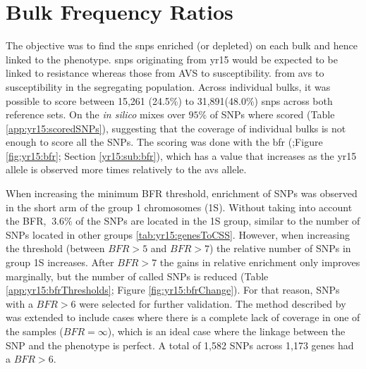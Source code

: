 \section{Bulk Frequency Ratios}
\label{sec:yr15:bfr}



The objective was to find the \acrshort{snp}s enriched  (or depleted) on each bulk and hence linked to the phenotype.  \Glspl{snp} originating from \gls{yr15} would be expected to be linked to resistance whereas those from AVS to susceptibility. from \gls{avs} to susceptibility in the segregating population. 
Across individual bulks, it was possible to score between 15,261 (24.5\%) to 31,891(48.0\%) \glspl{snp} across both reference sets.
On the \textit{in silico} mixes over $95\%$ of SNPs where scored (Table \ref{app:yr15:scoredSNPs}), suggesting that the coverage of individual bulks is not enough to score all the SNPs.  
The scoring was done with the \acrlong{bfr} (\citealt{Trick2012};Figure \ref{fig:yr15:bfr}; Section \ref{yr15:sub:bfr}), which has a value that increases as the \acrshort{yr15} allele is observed more times relatively to the \acrshort{avs} allele.



When increasing the minimum BFR threshold, enrichment of SNPs was observed in the short arm of the group 1 chromosomes (1S). 
Without taking into account the BFR, $~3.6\%$ of the SNPs are located in the 1S group, similar to the number of SNPs located in other groups \ref{tab:yr15:genesToCSS}. 
However, when increasing the threshold  (between $BFR > 5 $ and $BFR > 7$) the relative number of SNPs in group 1S increases. 
After $BFR>7$ the gains in relative enrichment only improves marginally, but the number of called SNPs is reduced (Table \ref{app:yr15:bfrThresholds}; Figure \ref{fig:yr15:bfrChange}).
For that reason, SNPs with a $BFR>6$ were selected for further validation. 
The method described by \citet{Trick2012} was extended to include cases where there is a complete lack of coverage in one of the samples ($BFR=\infty$), which is an ideal case where the linkage between the SNP and the phenotype is perfect. 
A total of 1,582 SNPs across 1,173 genes had a $BFR>6$.



